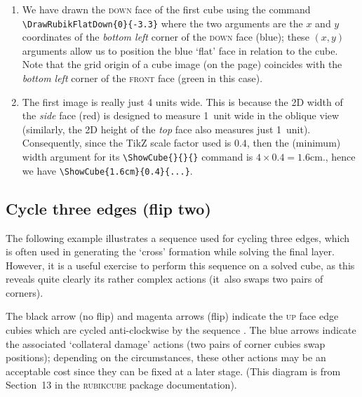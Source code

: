 \documentclass[a4paper]{article}
\begin{document}
\begin{enumerate} 

 \item   We have drawn the  \textsc{down} face of the first cube using the command
\verb!\DrawRubikFlatDown{0}{-3.3}! where the two arguments are  the $x$ and 
$y$ coordinates of the \textit{bottom left} corner of the \textsc{down} face  
(blue); these $(x,y)$ arguments allow us to position the blue `flat' face in 
relation to the cube. Note that the grid origin of  a cube image (on the page) 
coincides with the \textit{bottom left} corner of the \textsc{front} face 
(green in this case).

\item   The first image is really just 4 units wide. This is because the 2D width 
of the  \textit{side}  face (red) is designed to measure  1~unit wide in the 
oblique view (similarly, the 2D height of the  \textit{top} face also measures 
just 1~unit). Consequently, since the TikZ scale factor used is $0.4$, then 
the (minimum) width argument for its \verb!\ShowCube{}{}{}! command is 
$4\times 0.4 = 1.6$cm., hence we have \verb!\ShowCube{1.6cm}{0.4}{...}!.

\end{enumerate}


\pagebreak

\subsection[Cycle three edges]{Cycle three edges (flip two)}

The following example illustrates a sequence used for cycling three  edges, 
which is often used  in generating the `cross' formation while solving the 
final layer. However, it is a useful exercise to perform this sequence on 
a solved cube, as this  reveals quite clearly  its rather complex actions 
(it~also swaps two pairs of corners).

 The black arrow (no flip) and magenta arrows (flip) indicate  the \textsc{up} 
 face  edge cubies which are cycled anti-clockwise by the  sequence 
. The blue arrows indicate the associated 
`collateral damage' actions (two pairs of corner cubies swap positions); 
depending on the circumstances, these other actions may be an  acceptable 
cost since they can be fixed at a later stage. (This diagram  is from 
Section~13 in the \textsc{rubikcube} package documentation).
\end{document}
